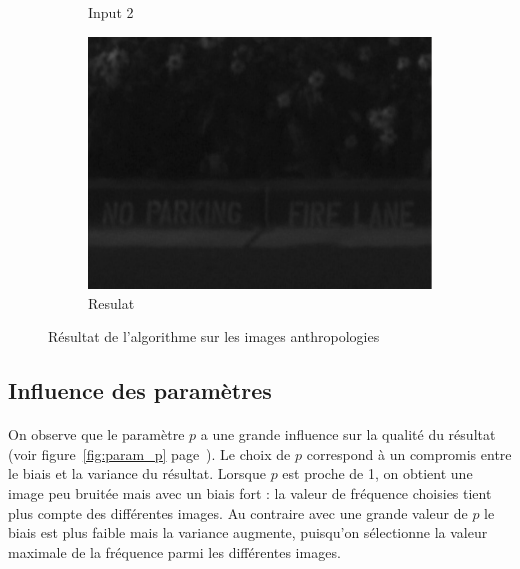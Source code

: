 \documentclass[a4paper,10pt]{report}
\begin{document}
\begin{figure}[h]
\begin{subfigure}{0.32\textwidth}
    \caption{Input 2}
    \label{fig:fire3}
  \end{subfigure}
  \begin{subfigure}{0.32\textwidth}
    \includegraphics[width=0.9\linewidth]{ressource/detail_fire_res.png} 
    \caption{Resulat}
    \label{fig:fire_result}
  \end{subfigure}
  
  \caption{Résultat de l'algorithme sur les images anthropologies}
\label{fig:anthro}
\end{figure}


\subsection{Influence des paramètres}
\paragraph{}
On observe que le paramètre \(p\) a une grande influence sur la qualité du résultat (voir
figure~\ref{fig:param_p} page~\pageref{fig:param_p}).
Le choix de \(p\) correspond à un compromis entre le biais et la variance du résultat. 
Lorsque \(p\) est proche de 1, on obtient une image peu bruitée mais avec un biais fort : la valeur 
de fréquence choisies tient plus compte des différentes images.
Au contraire avec une grande valeur de \(p\) le biais est plus faible mais la variance augmente,
puisqu'on sélectionne la valeur maximale de la fréquence parmi les différentes images.
\end{document}
